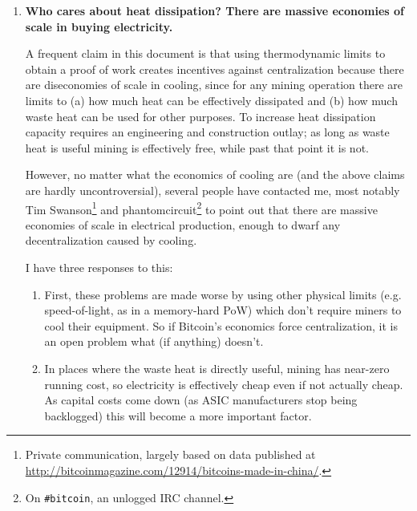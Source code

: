 \documentclass[letterpaper]{article}
\theoremstyle{xxx}
\theoremstyle{evil}
\theoremstyle{yyy}
\theoremstyle{plain}
\theoremstyle{zzz}
\begin{document}
\begin{enumerate}
\item \textbf{Who cares about heat dissipation? There are massive economies of scale
in buying electricity.}

A frequent claim in this document is that using thermodynamic limits to obtain
a proof of work creates incentives against centralization because there are
diseconomies of scale in cooling, since for any mining operation there are
limits to (a) how much heat can be effectively dissipated and (b) how much waste
heat can be used for other purposes. To increase heat dissipation capacity
requires an engineering and construction outlay; as long as waste heat is useful
mining is effectively free, while past that point it is not.

However, no matter what the economics of cooling are (and the above claims are
hardly uncontroversial), several people have contacted me, most notably Tim
Swanson\footnote{Private communication, largely based on data published at
\url{http://bitcoinmagazine.com/12914/bitcoins-made-in-china/}.}
and phantomcircuit\footnote{On \texttt{\#bitcoin}, an unlogged IRC channel.} to
point out that there are massive economies of scale in electrical production,
enough to dwarf any decentralization caused by cooling.

I have three responses to this:
\begin{enumerate}
\item First, these problems are made worse by using other physical limits (e.g.
speed-of-light, as in a memory-hard PoW) which don't require miners to cool
their equipment. So if Bitcoin's economics force centralization, it is an open
problem what (if anything) doesn't.

\item In places where the waste heat is directly useful, mining has near-zero
running cost, so electricity is effectively cheap even if not actually cheap.
As capital costs come down (as ASIC manufacturers stop being backlogged) this
will become a more important factor.


\end{enumerate}
\end{enumerate}
\end{document}
